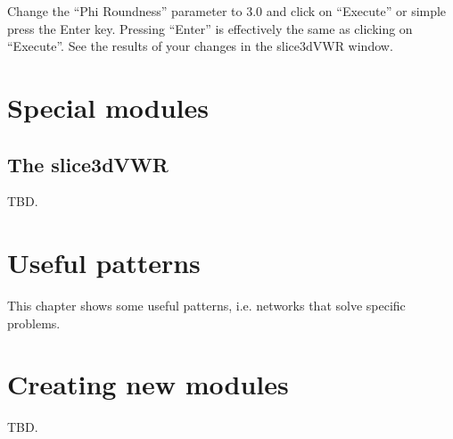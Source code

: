 Change the ``Phi Roundness'' parameter to $3.0$ and click on
``Execute'' or simple press the Enter key.  Pressing ``Enter'' is
effectively the same as clicking on ``Execute''.  See the results of
your changes in the slice3dVWR window.

\chapter{Special modules}\label{secSpecialModules}
%
%
\setfooter{\thepage}{}{}{}{}{\thepage}%

\section{The slice3dVWR}
TBD.

\chapter{Useful patterns}
This chapter shows some useful patterns, i.e. networks that solve
specific problems.

\chapter{Creating new modules}
TBD.

%

%
\setfooter{\thepage}{}{}{}{}{\thepage}%
\printindex%


